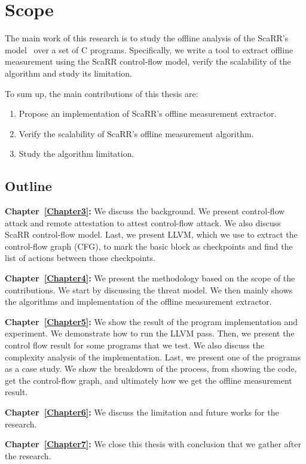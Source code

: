 
\chapter{Scope} %
\label{Chapter2} %

The main work of this research is to study the offline analysis of the ScaRR's
model~\cite{toffaliniScaRRScalableRuntime2019} over a set of C programs.
Specifically, we write a tool to extract offline measurement using the ScaRR
control-flow model, verify the scalability of the algorithm and study its
limitation.

To sum up, the main contributions of this thesis are:
\begin{enumerate}
	\item Propose an implementation of ScaRR's offline measurement extractor.
	\item Verify the scalability of ScaRR's offline measurement algorithm.
	\item Study the algorithm limitation.
\end{enumerate}

\section{Outline}
\label{sec:outline}

\vspace{0.5cm}
\noindent \textbf{Chapter~\ref{Chapter3}:} We discuss the background. We present
control-flow attack and remote attestation to attest control-flow attack. We
also discuss ScaRR control-flow model. Last, we present LLVM, which we use to
extract the control-flow graph (CFG), to mark the basic block as checkpoints and
find the list of actions between those checkpoints.

\vspace{0.5cm}
\noindent \textbf{Chapter~\ref{Chapter4}:} We present the methodology based on
the scope of the contributions. We start by discussing the threat model. We then
mainly shows the algorithms and implementation of the offline measurement
extractor.

\vspace{0.5cm}
\noindent \textbf{Chapter~\ref{Chapter5}:} We show the result of the program
implementation and experiment. We demonstrate how to run the LLVM pass. Then, we
present the control flow result for some programs that we test. We also discuss
the complexity analysis of the implementation. Last, we present one of the
programs as a case study. We show the breakdown of the process, from showing the
code, get the control-flow graph, and ultimately how we get the offline
measurement result.

\vspace{0.5cm}
\noindent \textbf{Chapter~\ref{Chapter6}:} We discuss the limitation and future
works for the research.

\vspace{0.5cm}
\noindent \textbf{Chapter~\ref{Chapter7}:} We close this thesis with conclusion
that we gather after the research.